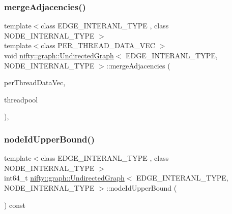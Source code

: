 \mbox{\label{classnifty_1_1graph_1_1UndirectedGraph_a397456fa4036ba4606a375e3c78cb9d4}} 
\subsubsection{\texorpdfstring{merge\+Adjacencies()}{mergeAdjacencies()}}
{\footnotesize\ttfamily template$<$class E\+D\+G\+E\+\_\+\+I\+N\+T\+E\+R\+A\+N\+L\+\_\+\+T\+Y\+PE , class N\+O\+D\+E\+\_\+\+I\+N\+T\+E\+R\+N\+A\+L\+\_\+\+T\+Y\+PE $>$ \\
template$<$class P\+E\+R\+\_\+\+T\+H\+R\+E\+A\+D\+\_\+\+D\+A\+T\+A\+\_\+\+V\+EC $>$ \\
void \hyperlink{classnifty_1_1graph_1_1UndirectedGraph}{nifty\+::graph\+::\+Undirected\+Graph}$<$ E\+D\+G\+E\+\_\+\+I\+N\+T\+E\+R\+A\+N\+L\+\_\+\+T\+Y\+PE, N\+O\+D\+E\+\_\+\+I\+N\+T\+E\+R\+N\+A\+L\+\_\+\+T\+Y\+PE $>$\+::merge\+Adjacencies (\begin{DoxyParamCaption}\item[{P\+E\+R\+\_\+\+T\+H\+R\+E\+A\+D\+\_\+\+D\+A\+T\+A\+\_\+\+V\+EC \&}]{per\+Thread\+Data\+Vec,  }\item[{\hyperlink{classnifty_1_1parallel_1_1ThreadPool}{parallel\+::\+Thread\+Pool} \&}]{threadpool }\end{DoxyParamCaption})\hspace{0.3cm}{\ttfamily [inline]}, {\ttfamily [protected]}}

\mbox{\label{classnifty_1_1graph_1_1UndirectedGraph_adab2b7ff99de38d68bccb75d928252ac}} 
\subsubsection{\texorpdfstring{node\+Id\+Upper\+Bound()}{nodeIdUpperBound()}}
{\footnotesize\ttfamily template$<$class E\+D\+G\+E\+\_\+\+I\+N\+T\+E\+R\+A\+N\+L\+\_\+\+T\+Y\+PE , class N\+O\+D\+E\+\_\+\+I\+N\+T\+E\+R\+N\+A\+L\+\_\+\+T\+Y\+PE $>$ \\
int64\+\_\+t \hyperlink{classnifty_1_1graph_1_1UndirectedGraph}{nifty\+::graph\+::\+Undirected\+Graph}$<$ E\+D\+G\+E\+\_\+\+I\+N\+T\+E\+R\+A\+N\+L\+\_\+\+T\+Y\+PE, N\+O\+D\+E\+\_\+\+I\+N\+T\+E\+R\+N\+A\+L\+\_\+\+T\+Y\+PE $>$\+::node\+Id\+Upper\+Bound (\begin{DoxyParamCaption}{ }\end{DoxyParamCaption}) const}

